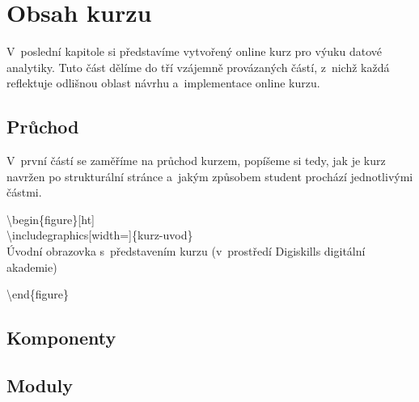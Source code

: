 \hypertarget{obsah-kurzu}{%
\chapter{Obsah kurzu}\label{obsah-kurzu}}

V~poslední kapitole si představíme vytvořený online kurz pro výuku datové analytiky. Tuto část dělíme do tří vzájemně provázaných částí, z~nichž každá reflektuje odlišnou oblast návrhu a~implementace online kurzu.

\hypertarget{prux16fchod}{%
\section{Průchod}\label{prux16fchod}}

V~první částí se zaměříme na průchod kurzem, popíšeme si tedy, jak je kurz navržen po strukturální stránce a~jakým způsobem student prochází jednotlivými částmi.

\textbackslash begin\{figure\}{[}ht{]}\\
\centering \textbackslash includegraphics{[}width={]}\{kurz-uvod\}\\

\caption{Úvodní obrazovka s~představením kurzu (v~prostředí Digiskills digitální akademie)}
    \label{kurz-uvod}

\textbackslash end\{figure\}

\hypertarget{komponenty}{%
\section{Komponenty}\label{komponenty}}

\hypertarget{moduly}{%
\section{Moduly}\label{moduly}}
